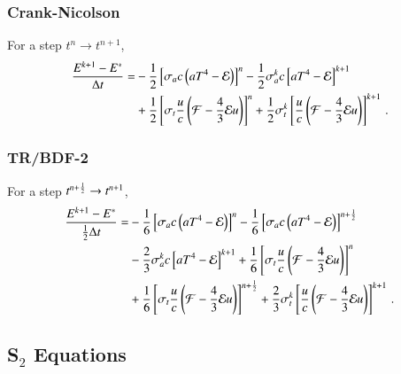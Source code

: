 \subsubsection{Crank-Nicolson}
For a step $t^n\rightarrow t^{n+1}$,
\begin{equation}\begin{split}
  \frac{E^{k+1}-E^*}{\Delta t} = &
  -\frac{1}{2}\left[\sigma_{a} c\left(aT^4 - \mathcal{E}\right)\right]^n
  -\frac{1}{2}\sigma_{a}^k c\left[aT^4 - \mathcal{E}\right]^{k+1}\\
  &+\frac{1}{2}\left[\sigma_{t}\frac{u}{c}\left(\mathcal{F}-\frac{4}{3}\mathcal{E} u\right)\right]^n
   +\frac{1}{2}\sigma_t^k\left[\frac{u}{c}\left(\mathcal{F}-\frac{4}{3}\mathcal{E} u\right)\right]^{k+1}
  \, .
\end{split}\end{equation}

\subsubsection{TR/BDF-2}
For a step $t^{n+\frac{1}{2}}\rightarrow t^{n+1}$,
\begin{equation}\begin{split}
  \frac{E^{k+1}-E^*}{\frac{1}{2}\Delta t} = &
  -\frac{1}{6}\left[\sigma_a c\left(aT^4 - \mathcal{E}\right)\right]^n
  -\frac{1}{6}\left[\sigma_a c\left(aT^4 - \mathcal{E}\right)\right]^{n+\frac{1}{2}}\\
  &-\frac{2}{3}\sigma_a^k c\left[aT^4 - \mathcal{E}\right]^{k+1}
   +\frac{1}{6}\left[\sigma_t\frac{u}{c}\left(\mathcal{F}-\frac{4}{3}\mathcal{E} u\right)\right]^n\\
  &+\frac{1}{6}\left[\sigma_t\frac{u}{c}\left(\mathcal{F}-\frac{4}{3}\mathcal{E} u\right)\right]^{n+\frac{1}{2}}
   +\frac{2}{3}\sigma_t^k\left[\frac{u}{c}\left(\mathcal{F}-\frac{4}{3}\mathcal{E} u\right)\right]^{k+1}
  \, .
\end{split}\end{equation}


\subsection{\texorpdfstring{S$_2$}{S-2} Equations}
